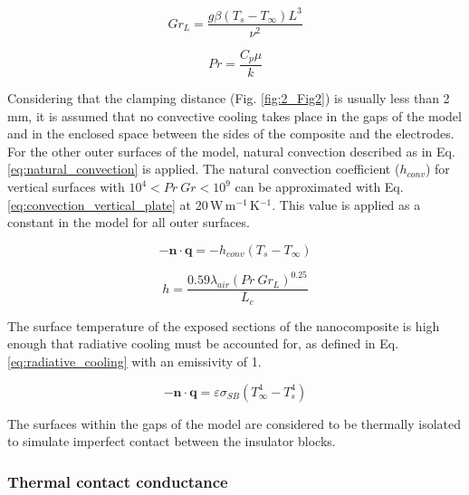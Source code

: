 \begin{equation}
Gr_L = \frac{g \beta \left( T_s - T_{\infty} \right) L^3}{\nu^2}
\label{eq:grashof_number}
\end{equation}

\begin{equation}
Pr = \frac{C_p \mu}{k}
\label{eq:prandtl_number}
\end{equation}

Considering that the clamping distance (Fig. \ref{fig:2_Fig2}) is usually less than \mbox{2\,mm}, it is assumed that no convective cooling takes place in the gaps of the model and in the enclosed space between the sides of the composite and the electrodes. 
For the other outer surfaces of the model, natural convection described as in Eq. \ref{eq:natural_convection} is applied. 
The natural convection coefficient ($h_{conv}$) for vertical surfaces with $10^4 < Pr \ Gr < 10^9$ can be approximated with Eq. \ref{eq:convection_vertical_plate} at \mbox{20\,W\,m$^{-1}$\,K$^{-1}$}.
This value is applied as a constant in the model for all outer surfaces. 

\begin{equation}
-\mathbf{n} \cdot \mathbf{q} = -h_{conv} \left( T_s -T_{\infty} \right)
\label{eq:natural_convection}
\end{equation}

\begin{equation}
h = \frac{0.59 \lambda_{air} \left(Pr \ Gr_L\right)^{0.25}}{L_c}
\label{eq:convection_vertical_plate}
\end{equation}

The surface temperature of the exposed sections of the nanocomposite is high enough that radiative cooling must be accounted for, as defined in Eq. \ref{eq:radiative_cooling} with an emissivity of 1. 

\begin{equation}
- \mathbf{n} \cdot \mathbf{q} = \varepsilon \sigma_{SB} \left( T_{\infty}^4 - T_s^4 \right) 
\label{eq:radiative_cooling}
\end{equation}

The surfaces within the gaps of the model are considered to be thermally isolated to simulate imperfect contact between the insulator blocks.

\subsubsection{Thermal contact conductance}

